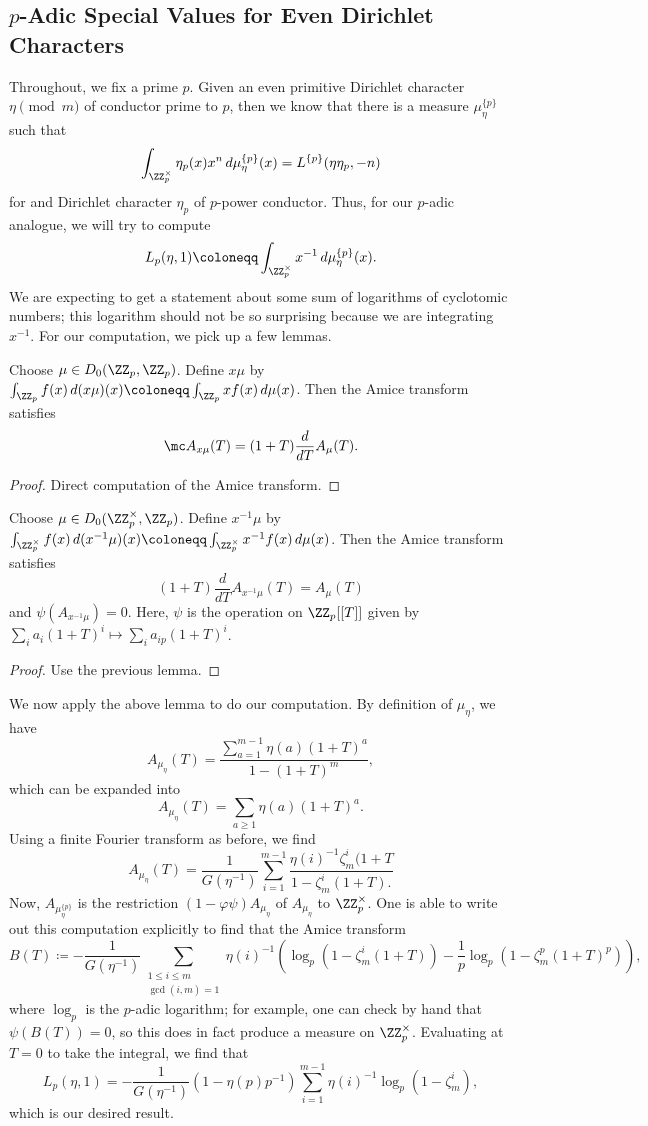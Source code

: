 \documentclass{article}
\begin{document}
\subsection{\texorpdfstring{$p$}{p}-Adic Special Values for Even Dirichlet Characters}
Throughout, we fix a prime $p$. Given an even primitive Dirichlet character $\eta\pmod m$ of conductor prime to $p$, then we know that there is a measure $\mu_\eta^{\{p\}}$ such that
\[\int_{\ZZ_p^\times}\eta_p(x)x^n\,d\mu_\eta^{\{p\}}(x)=L^{\{p\}}(\eta\eta_p,-n)\]
for and Dirichlet character $\eta_p$ of $p$-power conductor. Thus, for our $p$-adic analogue, we will try to compute
\[L_p(\eta,1)\coloneqq\int_{\ZZ_p^\times}x^{-1}\,d\mu_\eta^{\{p\}}(x).\]
We are expecting to get a statement about some sum of logarithms of cyclotomic numbers; this logarithm should not be so surprising because we are integrating $x^{-1}$. For our computation, we pick up a few lemmas.
\begin{lemma}
	Choose $\mu\in D_0(\ZZ_p,\ZZ_p)$. Define $x\mu$ by $\int_{\ZZ_p}f(x)\,d(x\mu)(x)\coloneqq\int_{\ZZ_p}xf(x)\,d\mu(x)$. Then the Amice transform satisfies
	\[\mc A_{x\mu}(T)=(1+T)\frac d{dT}A_\mu(T).\]
\end{lemma}
\begin{proof}
	Direct computation of the Amice transform.
\end{proof}
\begin{lemma}
	Choose $\mu\in D_0(\ZZ_p^\times,\ZZ_p)$. Define $x^{-1}\mu$ by $\int_{\ZZ_p^\times}f(x)\,d(x^{-1}\mu)(x)\coloneqq\int_{\ZZ_p^\times}x^{-1}f(x)\,d\mu(x)$. Then the Amice transform satisfies
	\[(1+T)\frac d{dT}A_{x^{-1}\mu}(T)=A_\mu(T)\]
	and $\psi(A_{x^{-1}\mu})=0$. Here, $\psi$ is the operation on $\ZZ_p[[T]]$ given by $\sum_ia_i(1+T)^i\mapsto\sum_ia_{ip}(1+T)^i$.
\end{lemma}
\begin{proof}
	Use the previous lemma.
\end{proof}
We now apply the above lemma to do our computation. By definition of $\mu_\eta$, we have
\[A_{\mu_\eta}(T)=\frac{\sum_{a=1}^{m-1}\eta(a)(1+T)^a}{1-(1+T)^m},\]
which can be expanded into
\[A_{\mu_\eta}(T)=\sum_{a\ge1}\eta(a)(1+T)^a.\]
Using a finite Fourier transform as before, we find
\[A_{\mu_\eta}(T)=\frac1{G\left(\eta^{-1}\right)}\sum_{i=1}^{m-1}\frac{\eta(i)^{-1}\zeta_m^i(1+T}{1-\zeta_m^i(1+T).}\]
Now, $A_{\mu_\eta^{\{p\}}}$ is the restriction $(1-\varphi\psi)A_{\mu_\eta}$ of $A_{\mu_\eta}$ to $\ZZ_p^\times$. One is able to write out this computation explicitly to find that the Amice transform
\[B(T)\coloneqq-\frac1{G\left(\eta^{-1}\right)}\sum_{\substack{1\le i\le m\\\gcd(i,m)=1}}\eta(i)^{-1}\left(\log_p\left(1-\zeta_m^i(1+T)\right)-\frac1p\log_p\left(1-\zeta_m^p(1+T)^p\right)\right),\]
where $\log_p$ is the $p$-adic logarithm; for example, one can check by hand that $\psi(B(T))=0$, so this does in fact produce a measure on $\ZZ_p^\times$. Evaluating at $T=0$ to take the integral, we find that
\[L_p(\eta,1)=-\frac1{G\left(\eta^{-1}\right)}\left(1-\eta(p)p^{-1}\right)\sum_{i=1}^{m-1}\eta(i)^{-1}\log_p\left(1-\zeta_m^i\right),\]
which is our desired result.
\end{document}
